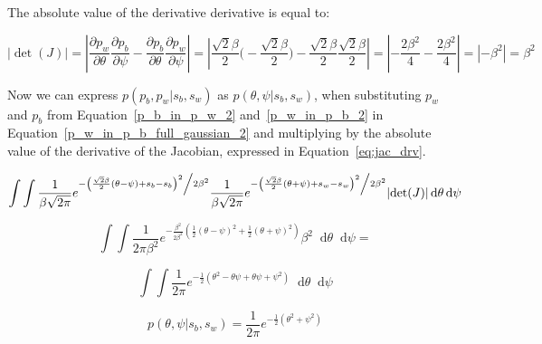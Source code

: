 \documentclass[a4paper,11pt]{article}
\theoremstyle{mytheor}
\newcommand*\diff{\mathop{}\!\mathrm{d}}
\begin{document}
The absolute value of the derivative derivative is equal to:

\begin{equation}
    \label{eq:jac_drv}
   \lvert \det(J) \rvert = \left\lvert\frac{\partial p_w}{\partial \theta}\frac{\partial p_b}{\partial \psi} - \frac{\partial p_b}{\partial \theta}\frac{\partial p_w}{\partial \psi} \right\rvert = \left\lvert\frac{\sqrt{2}\beta}{2}\Big(-\frac{\sqrt{2}\beta}{2}\Big) - \frac{\sqrt{2}\beta}{2}\frac{\sqrt{2}\beta}{2} \right\rvert = \left\lvert-\frac{2\beta^2}{4} - \frac{2\beta^2}{4} \right\rvert = \left\lvert-\beta^2\right\rvert = \beta^2
\end{equation}

Now we can express $p(p_b,p_w|s_b,s_w)$ as $p(\theta,\psi|s_b,s_w)$, when substituting $p_w$ and $p_b$ from Equation~\ref{p_b_in_p_w_2} and~\ref{p_w_in_p_b_2} in Equation~\ref{p_w_in_p_b_full_gaussian_2} and multiplying by the absolute value of the derivative of the Jacobian, expressed in Equation~\ref{eq:jac_drv}.

\begin{equation}
    \label{p_w_in_p_b_full_gaussian_2}
    \int\int\frac{1}{{\beta \sqrt {2\pi } }}e^{{{ - \left( {\frac{\sqrt{2}\beta}{2}(\theta-\psi) + s_b - s_b } \right)^2 } \mathord{\left/ {\vphantom {{ - \left( {\frac{\sqrt{2}\beta}{2}(\theta-\psi) + s_b - s_b } \right)^2 } {2\beta ^2 }}} \right. \kern-\nulldelimiterspace} {2\beta ^2 }}}
    \frac{1}{{\beta \sqrt {2\pi } }}e^{{{ - \left( {\frac{\sqrt{2}\beta}{2}(\theta+\psi) + s_w - s_w } \right)^2 } \mathord{\left/ {\vphantom {{ - \left( {\frac{\sqrt{2}\beta}{2}(\theta+\psi) + s_w - s_w } \right)^2 } {2\beta ^2 }}} \right. \kern-\nulldelimiterspace} {2\beta ^2 }}} \lvert \det(J) \rvert\diff\theta\diff\psi
\end{equation}

\begin{equation}
    \label{p_w_in_p_b_full_gaussian_3}
    \int\int\frac{1}{{2\pi\beta^2}}
    e^{-\frac{\beta^2}{2\beta^2}\left( {\frac{1}{2}(\theta-\psi)^2} + \frac{1}{2}(\theta+\psi)^2 \right) } \beta^2\diff\theta\diff\psi=
\end{equation}

\begin{equation}
    \label{p_w_in_p_b_full_gaussian_4}
    \int\int\frac{1}{{2\pi}}
    e^{-\frac{1}{2}\left( \theta^2-\theta\psi +\theta\psi+\psi^2 \right) } \diff\theta\diff\psi
\end{equation}

\begin{equation}
    \label{p_w_in_p_b_full_gaussian_5}
    p(\theta,\psi|s_b,s_w) = \frac{1}{{2\pi}}
    e^{-\frac{1}{2}\left( \theta^2+\psi^2 \right) }
\end{equation}
\end{document}
